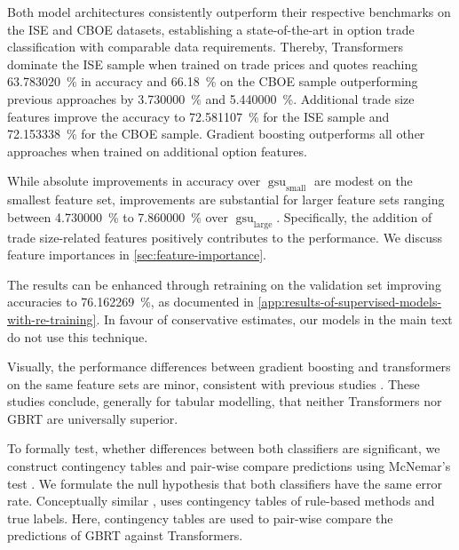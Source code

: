 Both model architectures consistently outperform their respective benchmarks on the \gls{ISE} and \gls{CBOE} datasets, establishing a state-of-the-art in option trade classification with comparable data requirements. Thereby, Transformers dominate the \gls{ISE} sample when trained on trade prices and quotes reaching \SI{63.783020}{\percent}  in accuracy and \SI{66.18}{\percent} on the \gls{CBOE} sample outperforming previous approaches by \SI{3.730000}{\percent} and \SI{5.440000}{\percent}. Additional trade size features improve the accuracy to \SI{72.581107}{\percent} for the \gls{ISE} sample and \SI{72.153338}{\percent} for the \gls{CBOE} sample. Gradient boosting outperforms all other approaches when trained on additional option features.

While absolute improvements in accuracy over $\operatorname{gsu}_{\mathrm{small}}$ are modest on the smallest feature set, improvements are substantial for larger feature sets ranging between \SI{4.730000}{\percent} to \SI{7.860000}{\percent} over $\operatorname{gsu}_{\mathrm{large}}$. Specifically, the addition of trade size-related features positively contributes to the performance. We discuss feature importances in \cref{sec:feature-importance}.

The results can be enhanced through retraining on the validation set improving accuracies to \SI{76.162269}{\percent}, as documented in \cref{app:results-of-supervised-models-with-re-training}. In favour of conservative estimates, our models in the main text do not use this technique.

Visually, the performance differences between gradient boosting and transformers on the same feature sets are minor, consistent with previous studies \autocites{grinsztajnWhyTreebasedModels2022}{gorishniyRevisitingDeepLearning2021}. These studies conclude, generally for tabular modelling, that neither Transformers nor \gls{GBRT} are universally superior.

To formally test, whether differences between both classifiers are significant, we construct contingency tables and pair-wise compare predictions using McNemar's test \autocite[][153--157]{mcnemarNoteSamplingError1947}. We formulate the null hypothesis that both classifiers have the same error rate.
Conceptually similar \textcite[][267]{odders-whiteOccurrenceConsequencesInaccurate2000}, uses contingency tables of rule-based methods and true labels. Here, contingency tables are used to pair-wise compare the predictions of \gls{GBRT} against Transformers.

